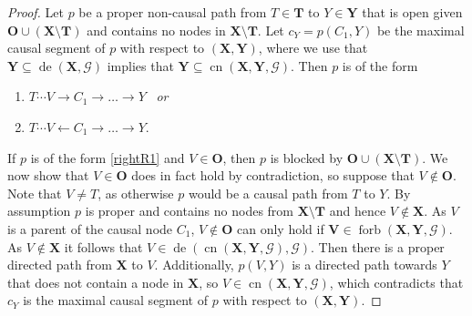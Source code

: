 \documentclass[11pt,a4paper]{article}
\theoremstyle{definition}
\theoremstyle{remark}
\DeclareMathOperator{\Forbb}{forb}
\DeclareMathOperator{\de}{de}
\DeclareMathOperator{\CN}{cn}
\newcommand{\g}[1][G]{\mathcal{#1}}
\newcommand{\fb}[2][X,Y]{\Forbb(\mathbf{#1},#2)}
\newcommand{\cnb}[2][X,Y]{\CN(\mathbf{#1},#2)}
\begin{document}
\begin{proof}
	Let $p$ be a proper non-causal path from $T \in \mathbf{T}$ to $Y \in \mathbf{Y}$ that is open given $\mathbf{O} \cup (\mathbf{X} \setminus \mathbf{T})$ and contains no nodes in $\mathbf{X} \setminus \mathbf{T}$. 
	Let $c_{Y} = p(C_1,Y)$ be the maximal causal segment of $p$ with respect to $(\mathbf{X,Y})$, where we use that $\mathbf{Y} \subseteq \de(\mathbf{X},\g)$ implies that $\mathbf{Y} \subseteq \cnb{\g}$.
Then $p$ is of the form
	\begin{enumerate}[label=(\alph*)]
	\item
	$T \cdots V \rightarrow C_1 \rightarrow \dots \rightarrow Y$ \ \textit{or} \label{rightR1}
	\item
	$T \cdots V \leftarrow C_1 \rightarrow \dots \rightarrow Y$. \label{leftR1}
	\end{enumerate}
	
	If $p$ is of the form \ref{rightR1} and $V \in \mathbf{O}$, then $p$ is blocked by $\mathbf{O}\cup (\mathbf{X} \setminus \mathbf{T})$. We now show that $V \in \mathbf{O}$ does in fact hold by contradiction, so suppose that $V \notin \mathbf{O}$. Note that $V \neq T$, as otherwise $p$ would be a causal path from $T$ to $Y$. By assumption $p$ is proper and contains no nodes from $\mathbf{X} \setminus \mathbf{T}$ and hence $V \notin \mathbf{X}$. As $V$ is a parent of the causal node $C_1$, $V \notin \mathbf{O}$ can only hold if $\mathbf{V} \in \fb{\g}$. As $ V \notin \mathbf{X}$ it follows that $V \in \de(\cnb{\g},\g)$. Then there is a proper directed path from $\mathbf{X}$ to $V$. Additionally, $p(V,Y)$ is a directed path towards $Y$ that does not contain a node in $\mathbf{X}$, so $V \in \cnb{\g}$, which contradicts that $c_{Y}$ is the maximal causal segment of $p$ with respect to $(\mathbf{X,Y})$.
	

\end{proof}
\end{document}
